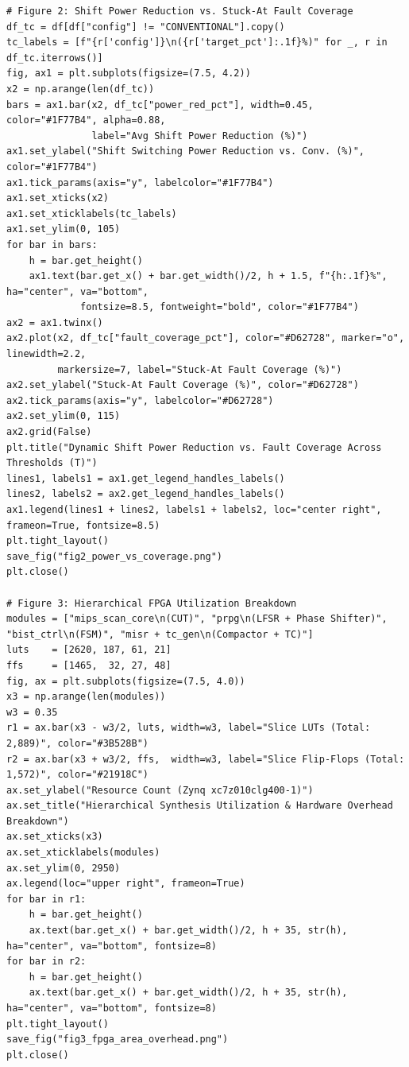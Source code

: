 \documentclass[conference]{IEEEtran}
\begin{document}
\begin{lstlisting}[style=pythonstyle, caption={Python Plot Generation Script (\texttt{generate\_plots.py})}]
# Figure 2: Shift Power Reduction vs. Stuck-At Fault Coverage
df_tc = df[df["config"] != "CONVENTIONAL"].copy()
tc_labels = [f"{r['config']}\n({r['target_pct']:.1f}%)" for _, r in df_tc.iterrows()]
fig, ax1 = plt.subplots(figsize=(7.5, 4.2))
x2 = np.arange(len(df_tc))
bars = ax1.bar(x2, df_tc["power_red_pct"], width=0.45, color="#1F77B4", alpha=0.88,
               label="Avg Shift Power Reduction (%)")
ax1.set_ylabel("Shift Switching Power Reduction vs. Conv. (%)", color="#1F77B4")
ax1.tick_params(axis="y", labelcolor="#1F77B4")
ax1.set_xticks(x2)
ax1.set_xticklabels(tc_labels)
ax1.set_ylim(0, 105)
for bar in bars:
    h = bar.get_height()
    ax1.text(bar.get_x() + bar.get_width()/2, h + 1.5, f"{h:.1f}%", ha="center", va="bottom",
             fontsize=8.5, fontweight="bold", color="#1F77B4")
ax2 = ax1.twinx()
ax2.plot(x2, df_tc["fault_coverage_pct"], color="#D62728", marker="o", linewidth=2.2,
         markersize=7, label="Stuck-At Fault Coverage (%)")
ax2.set_ylabel("Stuck-At Fault Coverage (%)", color="#D62728")
ax2.tick_params(axis="y", labelcolor="#D62728")
ax2.set_ylim(0, 115)
ax2.grid(False)
plt.title("Dynamic Shift Power Reduction vs. Fault Coverage Across Thresholds (T)")
lines1, labels1 = ax1.get_legend_handles_labels()
lines2, labels2 = ax2.get_legend_handles_labels()
ax1.legend(lines1 + lines2, labels1 + labels2, loc="center right", frameon=True, fontsize=8.5)
plt.tight_layout()
save_fig("fig2_power_vs_coverage.png")
plt.close()

# Figure 3: Hierarchical FPGA Utilization Breakdown
modules = ["mips_scan_core\n(CUT)", "prpg\n(LFSR + Phase Shifter)", "bist_ctrl\n(FSM)", "misr + tc_gen\n(Compactor + TC)"]
luts    = [2620, 187, 61, 21]
ffs     = [1465,  32, 27, 48]
fig, ax = plt.subplots(figsize=(7.5, 4.0))
x3 = np.arange(len(modules))
w3 = 0.35
r1 = ax.bar(x3 - w3/2, luts, width=w3, label="Slice LUTs (Total: 2,889)", color="#3B528B")
r2 = ax.bar(x3 + w3/2, ffs,  width=w3, label="Slice Flip-Flops (Total: 1,572)", color="#21918C")
ax.set_ylabel("Resource Count (Zynq xc7z010clg400-1)")
ax.set_title("Hierarchical Synthesis Utilization & Hardware Overhead Breakdown")
ax.set_xticks(x3)
ax.set_xticklabels(modules)
ax.set_ylim(0, 2950)
ax.legend(loc="upper right", frameon=True)
for bar in r1:
    h = bar.get_height()
    ax.text(bar.get_x() + bar.get_width()/2, h + 35, str(h), ha="center", va="bottom", fontsize=8)
for bar in r2:
    h = bar.get_height()
    ax.text(bar.get_x() + bar.get_width()/2, h + 35, str(h), ha="center", va="bottom", fontsize=8)
plt.tight_layout()
save_fig("fig3_fpga_area_overhead.png")
plt.close()
\end{lstlisting}
\end{document}

